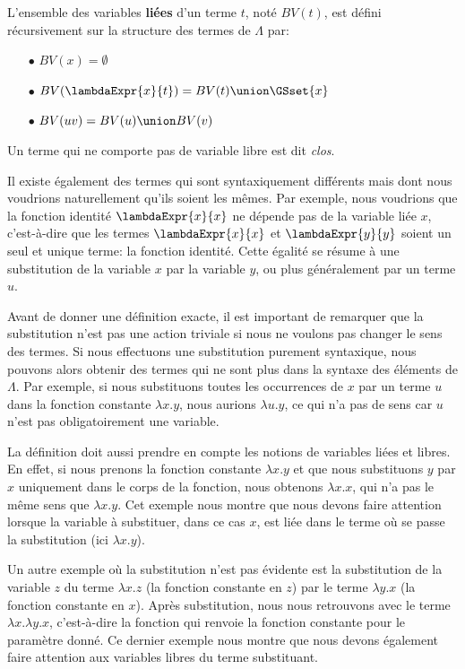 \begin{definition} 
  L'ensemble des variables \textbf{liées} d'un terme $t$, noté $BV(t)$, est défini
  récursivement sur la structure des termes de $\Lambda$ par:
  \begin{itemize}
  \item[$\bullet$] $BV(x) = \emptyset$
  \item[$\bullet$] $BV(\lambdaExpr{x}{t}) = BV(t) \union \GSset{x}$
  \item[$\bullet$] $BV(u v) = BV(u) \union BV(v)$
  \end{itemize}
\end{definition}

Un terme qui ne comporte pas de variable libre est dit \textit{clos}.

Il existe également des termes qui sont syntaxiquement différents mais dont nous
voudrions naturellement qu'ils soient les mêmes. Par exemple, nous voudrions que
la fonction identité $\lambdaExpr{x}{x}$ ne dépende pas de la variable liée $x$,
c'est-à-dire que les termes $\lambdaExpr{x}{x}$ et $\lambdaExpr{y}{y}$ soient un seul et
unique terme: la fonction identité. Cette égalité se résume à une substitution
de la variable $x$ par la variable $y$, ou plus généralement par un terme $u$.

Avant de donner une définition exacte, il est important de remarquer que la
substitution n'est pas une action triviale si nous ne voulons pas changer le
sens des termes. Si nous effectuons une
substitution purement syntaxique, nous pouvons alors obtenir des termes qui ne sont
plus dans la syntaxe des éléments de $\Lambda$. Par exemple, si nous
substituons toutes les occurrences de $x$ par un terme $u$ dans la fonction constante
$\lambda x . y$, nous aurions $\lambda u . y$, ce qui n'a pas de sens car $u$ n'est
pas obligatoirement une variable.

La définition doit aussi prendre en compte les notions de variables liées et libres. En effet, si nous
prenons la fonction constante $\lambda x . y$ et que nous substituons $y$ par 
$x$ uniquement dans le corps de la fonction, nous obtenons $\lambda x . x$, qui
n'a pas le même sens que $\lambda x . y$. Cet exemple nous montre que nous
devons faire attention lorsque la variable à substituer, dans ce cas $x$, est
liée dans le terme où se passe la substitution (ici $\lambda x . y$).

Un autre exemple où la substitution n'est pas évidente est la substitution de la
variable $z$ du terme $\lambda x . z$ (la fonction constante en $z$) par le terme
$\lambda y . x$ (la fonction constante en $x$). Après substitution, nous nous
retrouvons avec le terme $\lambda x . \lambda y . x$, c'est-à-dire la fonction
qui renvoie la fonction constante pour le paramètre donné. Ce dernier exemple
nous montre que nous devons également faire attention aux variables libres du
terme substituant.


